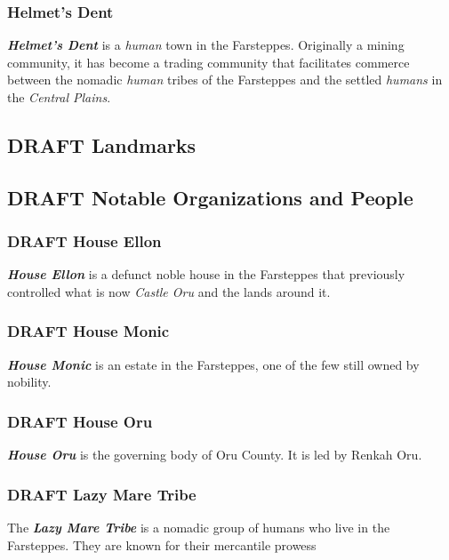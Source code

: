 \documentclass[11pt]{teraum_adventure}
\begin{document}
\subsubsection*{Helmet's Dent}
\label{sec:org00bf19d}
\textbf{\emph{Helmet's Dent}} is a \emph{human} town in the Farsteppes. Originally a
mining community, it has become a trading community that facilitates
commerce between the nomadic \emph{human} tribes of the Farsteppes and the
settled \emph{humans} in the \emph{Central Plains}.
\subsection*{{\bfseries\sffamily DRAFT} Landmarks}
\label{sec:orga147f79}
\subsection*{{\bfseries\sffamily DRAFT} Notable Organizations and People}
\label{sec:orge0c0eee}
\subsubsection*{{\bfseries\sffamily DRAFT} House Ellon}
\label{sec:org4fe4074}
\textbf{\emph{House Ellon}} is a defunct noble house in the Farsteppes that
previously controlled what is now \emph{Castle Oru} and the lands around
it.
\subsubsection*{{\bfseries\sffamily DRAFT} House Monic}
\label{sec:org9cd7d9c}
\textbf{\emph{House Monic}} is an estate in the Farsteppes, one of the few still
owned by nobility.

\subsubsection*{{\bfseries\sffamily DRAFT} House Oru}
\label{sec:org464ae56}
\textbf{\emph{House Oru}} is the governing body of Oru County. It
is led by Renkah Oru.
\subsubsection*{{\bfseries\sffamily DRAFT} Lazy Mare Tribe}
\label{sec:org8c1b08b}
The \textbf{\emph{Lazy Mare Tribe}} is a nomadic group of humans who live in the
Farsteppes. They are known for their mercantile prowess
\end{document}
